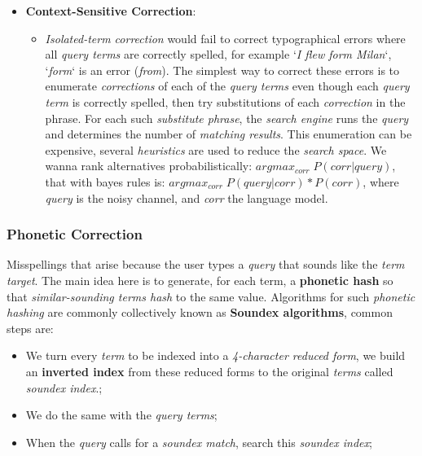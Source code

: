 \documentclass{article}
\begin{document}
\begin{itemize}
\begin{itemize}
\begin{itemize}
\end{itemize}
\end{itemize}
\item \textbf{Context-Sensitive Correction}:
\begin{itemize}
\item \emph{Isolated-term correction} would fail to correct typographical errors where all \emph{query terms} are correctly spelled, for example `\emph{I flew form Milan}`, `\emph{form}` is an error (\emph{from}). The simplest way to correct these errors is to enumerate \emph{corrections} of each of the \emph{query terms} even though each \emph{query term} is correctly spelled, then try substitutions of each \emph{correction} in the phrase. For each such \emph{substitute phrase}, the \emph{search engine} runs the \emph{query} and determines the number of \emph{matching results}. This enumeration can be expensive, several \emph{heuristics} are used to reduce the \emph{search space}. We wanna rank alternatives probabilistically: $argmax_{corr}\; P(corr|query)$, that with bayes rules is: $argmax_{corr}\;P(query|corr)*P(corr)$, where \emph{query} is the noisy channel, and \emph{corr} the language model.
\end{itemize}
\end{itemize}
\subsubsection{Phonetic Correction}
Misspellings that arise because the user types a \emph{query} that sounds like the \emph{term target}. The main idea here is to generate, for each term, a \textbf{phonetic hash} so that \emph{similar-sounding terms hash} to the same value. Algorithms for such \emph{phonetic hashing} are commonly collectively known as \textbf{Soundex algorithms}, common steps are:
\begin{itemize}
\item We turn every \emph{term} to be indexed into a \emph{4-character reduced form}, we build an \textbf{inverted index} from these reduced forms to the original \emph{terms} called \emph{soundex index}.;
\item We do the same with the \emph{query terms};
\item When the \emph{query} calls for a \emph{soundex match}, search this \emph{soundex index};
\end{itemize}
\end{document}
